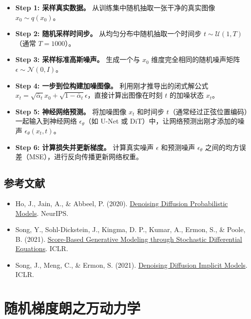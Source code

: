 \begin{itemize}
\tightlist
\item
  \textbf{Step 1: 采样真实数据。} 从训练集中随机抽取一张干净的真实图像 \(x_0\sim q(x_0)\)。
\item
  \textbf{Step 2: 随机采样时间步。} 从均匀分布中随机抽取一个时间步 \(t\sim\mathcal{U}(1,T)\)（通常 \(T=1000\)）。
\item
  \textbf{Step 3: 采样标准高斯噪声。} 生成一个与 \(x_0\) 维度完全相同的随机噪声矩阵 \(\epsilon\sim\mathcal{N}(0,I)\)。
\item
  \textbf{Step 4: 一步到位构建加噪图像。} 利用刚才推导出的闭式解公式 \(x_t=\sqrt{\bar{\alpha}_t}x_0+\sqrt{1-\bar{\alpha}_t}\epsilon\)，直接计算出图像在时刻 \(t\) 的加噪状态 \(x_t\)。
\item
  \textbf{Step 5: 神经网络预测。} 将加噪图像 \(x_t\) 和时间步 \(t\)（通常经过正弦位置编码）一起输入到神经网络 \(\epsilon_\theta\)（如 U-Net 或 DiT）中，让网络预测出刚才添加的噪声 \(\epsilon_\theta(x_t,t)\)。
\item
  \textbf{Step 6: 计算损失并更新梯度。} 计算真实噪声 \(\epsilon\) 和预测噪声 \(\epsilon_\theta\) 之间的均方误差（MSE），进行反向传播更新网络权重。
\end{itemize}

\hypertarget{ux53c2ux8003ux6587ux732e-154}{%
\subsection{参考文献}\label{ux53c2ux8003ux6587ux732e-154}}

\begin{itemize}
\tightlist
\item
  Ho, J., Jain, A., \& Abbeel, P. (2020). \href{https://arxiv.org/abs/2006.11239}{Denoising Diffusion Probabilistic Models}. NeurIPS.
\item
  Song, Y., Sohl-Dickstein, J., Kingma, D. P., Kumar, A., Ermon, S., \& Poole, B. (2021). \href{https://arxiv.org/abs/2011.13456}{Score-Based Generative Modeling through Stochastic Differential Equations}. ICLR.
\item
  Song, J., Meng, C., \& Ermon, S. (2021). \href{https://arxiv.org/abs/2010.02502}{Denoising Diffusion Implicit Models}. ICLR.
\end{itemize}

\clearpage

\hypertarget{ux968fux673aux68afux5ea6ux6717ux4e4bux4e07ux52a8ux529bux5b66}{%
\section{随机梯度朗之万动力学}\label{ux968fux673aux68afux5ea6ux6717ux4e4bux4e07ux52a8ux529bux5b66}}

